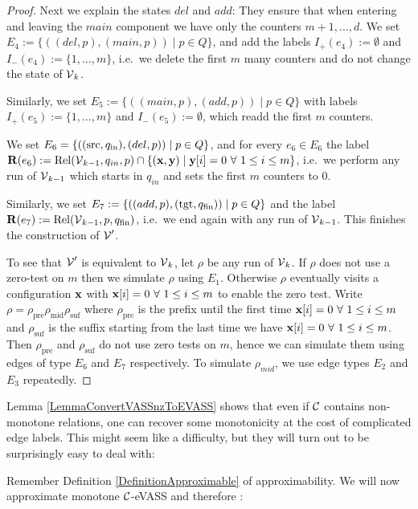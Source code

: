 \begin{proof}
Next we explain the states \(del\) and \(add\): They ensure that when entering and leaving the \(main\) component we have only the counters \(m+1, \dots, d\). 
We set \(E_4:=\{((del, p), (main, p)) \mid p \in Q\}\), and add the labels \(I_+(e_4):=\emptyset\) and \(I_-(e_4):=\{1,\dots, m\}\), i.e.\ we delete the first \(m\) many counters and do not change the state of \(\operatorname{\mathcal{V}}_k\).

Similarly, we set \(E_5:=\{((main, p),(add, p)) \mid p \in Q\}\) with labels \(I_+(e_5):=\{1,\dots, m\}\) and \(I_-(e_5):=\emptyset\), which readd the first \(m\) counters. 

We set \(E_6=\{((\operatorname{src}, q_{\text{in}}),(del, p)) \mid p \in Q\}\), and for every \(e_6 \in E_6\) the label \(\mathbf{R}(e_6):=\operatorname{Rel}(\operatorname{\mathcal{V}}_{k-1}, q_{in}, p) \cap \{(\mathbf{x}, \mathbf{y}) \mid \mathbf{y}[i]=0\ \forall\ 1 \leq i \leq m\}\), i.e.\ we perform any run of \(\operatorname{\mathcal{V}}_{k-1}\) which starts in \(q_{in}\) and sets the first \(m\) counters to \(0\). 

Similarly, we set \(E_7:=\{((add, p), (\operatorname{tgt}, q_{\text{fin}})) \mid p \in Q\}\) and the label \(\mathbf{R}(e_7):=\operatorname{Rel}(\operatorname{\mathcal{V}}_{k-1}, p, q_{\text{fin}})\), i.e.\ we end again with any run of \(\operatorname{\mathcal{V}}_{k-1}\). This finishes the construction of \(\operatorname{\mathcal{V}}'\).

To see that \(\operatorname{\mathcal{V}}'\) is equivalent to \(\operatorname{\mathcal{V}}_k\), let \(\rho\) be any run of \(\operatorname{\mathcal{V}}_k\). If \(\rho\) does not use a zero-test on \(m\) then we simulate \(\rho\) using \(E_1\). Otherwise \(\rho\) eventually visits a configuration \(\mathbf{x}\) with \(\mathbf{x}[i]=0\ \forall\ 1 \leq i \leq m\) to enable the zero test. Write \(\rho=\rho_{\text{pre}} \rho_{\text{mid}} \rho_{\text{suf}}\) where \(\rho_{\text{pre}}\) is the prefix until the first time \(\mathbf{x}[i]=0\ \forall\ 1 \leq i \leq m\) and \(\rho_{\text{suf}}\) is the suffix starting from the last time we have \(\mathbf{x}[i]=0\ \forall\ 1 \leq i \leq m\). Then \(\rho_{\text{pre}}\) and \(\rho_{\text{suf}}\) do not use zero tests on \(m\), hence we can simulate them using edges of type \(E_6\) and \(E_7\) respectively. To simulate \(\rho_{mid}\), we use edge types \(E_2\) and \(E_3\) repeatedly.
\end{proof}

Lemma \ref{LemmaConvertVASSnzToEVASS} shows that even if \(\mathcal{C}\) contains non-monotone relations, one can recover some monotonicity at the cost of complicated edge labels. This might seem like a difficulty, but they will turn out to be surprisingly easy to deal with:

Remember Definition \ref{DefinitionApproximable} of approximability.  We will now approximate monotone \(\mathcal{C}\)-eVASS and therefore \ConsideredModel:

